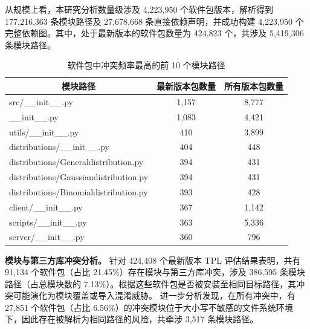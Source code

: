 从规模上看，本研究分析数量级涉及 4,223,950 个软件包版本，解析得到 177,216,363 条模块路径及 27,678,668 条直接依赖声明，并成功构建 4,223,950 个完整依赖图。其中，处于最新版本的软件包数量为 424,823 个，共涉及 5,419,306 条模块路径。

\begin{table}[t]
\small
\centering
\renewcommand{\arraystretch}{1.5}
\caption{软件包中冲突频率最高的前 10 个模块路径}
\label{tab:Top 10 module paths}
\begin{tabular}{lcc}
\hline
\multicolumn{1}{c}{\cellcolor[HTML]{C0C0C0}\textbf{模块路径}}      & \cellcolor[HTML]{C0C0C0}\textbf{最新版本包数量}  & \cellcolor[HTML]{C0C0C0}\textbf{所有版本包数量}\\ \hline
src/\_\_init\_\_.py                   & 1,157               & 8,777\\
\cellcolor[HTML]{EFEFEF}\_\_init\_\_.py                       & \cellcolor[HTML]{EFEFEF}1,083               & \cellcolor[HTML]{EFEFEF}4,421\\
utils/\_\_init\_\_.py                 & 410                & 3,899\\
\cellcolor[HTML]{EFEFEF}distributions/\_\_init\_\_.py         & \cellcolor[HTML]{EFEFEF}404                & \cellcolor[HTML]{EFEFEF}448\\
distributions/Generaldistribution.py  & 394                & 431\\
\cellcolor[HTML]{EFEFEF}distributions/Gaussiandistribution.py & \cellcolor[HTML]{EFEFEF}394                & \cellcolor[HTML]{EFEFEF}431\\
distributions/Binomialdistribution.py & 393                & 428\\
\cellcolor[HTML]{EFEFEF}client/\_\_init\_\_.py                & \cellcolor[HTML]{EFEFEF}367                & \cellcolor[HTML]{EFEFEF}1,142\\
scripts/\_\_init\_\_.py               & 363                & 5,336\\ 
\cellcolor[HTML]{EFEFEF}server/\_\_init\_\_.py               & \cellcolor[HTML]{EFEFEF}360                & \cellcolor[HTML]{EFEFEF}796\\ \hline
\end{tabular}

\end{table}

\textbf{模块与第三方库冲突分析。}
针对 424,408 个最新版本 TPL 评估结果表明，共有 91,134 个软件包（占比 21.45\%）存在模块与第三方库冲突，涉及 386,595 条模块路径（占总模块数的 7.13\%）。根据这些软件包是否被安装至相同目标路径，其冲突可能演化为模块覆盖或导入混淆威胁。
进一步分析发现，在所有冲突中，有 27,851 个软件包（占比 6.56\%）的冲突模块位于大小写不敏感的文件系统环境下，因此存在被解析为相同路径的风险，共牵涉 3,517 条模块路径。

